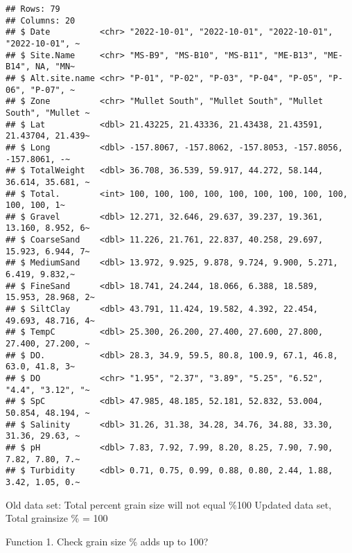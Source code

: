 \documentclass[
]{article}
\begin{document}
\begin{verbatim}
## Rows: 79
## Columns: 20
## $ Date          <chr> "2022-10-01", "2022-10-01", "2022-10-01", "2022-10-01", ~
## $ Site.Name     <chr> "MS-B9", "MS-B10", "MS-B11", "ME-B13", "ME-B14", NA, "MN~
## $ Alt.site.name <chr> "P-01", "P-02", "P-03", "P-04", "P-05", "P-06", "P-07", ~
## $ Zone          <chr> "Mullet South", "Mullet South", "Mullet South", "Mullet ~
## $ Lat           <dbl> 21.43225, 21.43336, 21.43438, 21.43591, 21.43704, 21.439~
## $ Long          <dbl> -157.8067, -157.8062, -157.8053, -157.8056, -157.8061, -~
## $ TotalWeight   <dbl> 36.708, 36.539, 59.917, 44.272, 58.144, 36.614, 35.681, ~
## $ Total.        <int> 100, 100, 100, 100, 100, 100, 100, 100, 100, 100, 100, 1~
## $ Gravel        <dbl> 12.271, 32.646, 29.637, 39.237, 19.361, 13.160, 8.952, 6~
## $ CoarseSand    <dbl> 11.226, 21.761, 22.837, 40.258, 29.697, 15.923, 6.944, 7~
## $ MediumSand    <dbl> 13.972, 9.925, 9.878, 9.724, 9.900, 5.271, 6.419, 9.832,~
## $ FineSand      <dbl> 18.741, 24.244, 18.066, 6.388, 18.589, 15.953, 28.968, 2~
## $ SiltClay      <dbl> 43.791, 11.424, 19.582, 4.392, 22.454, 49.693, 48.716, 4~
## $ TempC         <dbl> 25.300, 26.200, 27.400, 27.600, 27.800, 27.400, 27.200, ~
## $ DO.           <dbl> 28.3, 34.9, 59.5, 80.8, 100.9, 67.1, 46.8, 63.0, 41.8, 3~
## $ DO            <chr> "1.95", "2.37", "3.89", "5.25", "6.52", "4.4", "3.12", "~
## $ SpC           <dbl> 47.985, 48.185, 52.181, 52.832, 53.004, 50.854, 48.194, ~
## $ Salinity      <dbl> 31.26, 31.38, 34.28, 34.76, 34.88, 33.30, 31.36, 29.63, ~
## $ pH            <dbl> 7.83, 7.92, 7.99, 8.20, 8.25, 7.90, 7.90, 7.82, 7.80, 7.~
## $ Turbidity     <dbl> 0.71, 0.75, 0.99, 0.88, 0.80, 2.44, 1.88, 3.42, 1.05, 0.~
\end{verbatim}

Old data set: Total percent grain size will not equal \%100 Updated data
set, Total grainsize \% = 100

Function 1. Check grain size \% adds up to 100?
\end{document}

